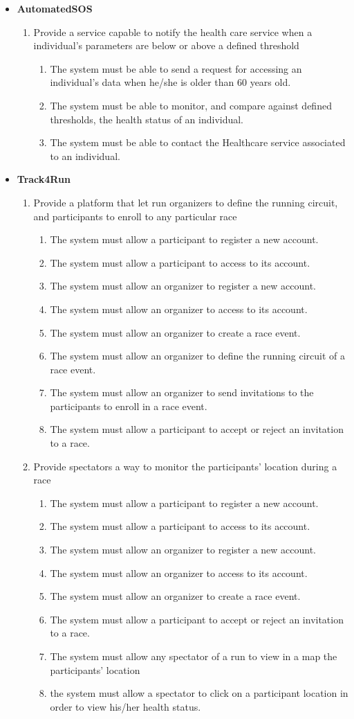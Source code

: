 \documentclass[12pt]{article}
\newcommand\requirement[1]{\item[{[R#1]}] }
\newcommand\goal[1]{\item[{[G#1]}] }
\begin{document}
\begin{itemize}
  \item{\textbf{AutomatedSOS}}
  \begin{enumerate}
    \goal{5} Provide a service capable to notify the health care service when a individual's parameters are below or above a defined threshold
    \begin{enumerate}
      \requirement{13} The system must be able to send a request for accessing an individual's data when he/she is older than 60 years old.
      \requirement{14} The system must be able to monitor, and compare against defined thresholds, the health status of an individual.
      \requirement{15} The system must be able to contact the Healthcare service associated to an individual.      
    \end{enumerate}
  \end{enumerate}
  
  \item{\textbf{Track4Run}}
  \begin{enumerate}
    \goal{6} Provide a platform that let run organizers to define the running circuit, and participants to enroll to any particular race
    \begin{enumerate}
      \requirement{16} The system must allow a participant to register a new account.
      \requirement{17} The system must allow a participant to access to its account.
      \requirement{18} The system must allow an organizer to register a new account.
      \requirement{19} The system must allow an organizer to access to its account.
      \requirement{20} The system must allow an organizer to create a race event.
      \requirement{21} The system must allow an organizer to define the running circuit of a race event.
      \requirement{22} The system must allow an organizer to send invitations to the participants to enroll in a race event.
      \requirement{23} The system must allow a participant to accept or reject an invitation to a race.
    \end{enumerate}
    \goal{7} Provide spectators a way to monitor the participants' location during a race
    \begin{enumerate}
      \requirement{16} The system must allow a participant to register a new account.
      \requirement{17} The system must allow a participant to access to its account.
      \requirement{18} The system must allow an organizer to register a new account.
      \requirement{19} The system must allow an organizer to access to its account.
      \requirement{20} The system must allow an organizer to create a race event.
      \requirement{23} The system must allow a participant to accept or reject an invitation to a race.
      \requirement{24} The system must allow any spectator of a run to view in a map the participants' location
      \requirement{25} the system must allow a spectator to click on a participant location in order to view his/her health status.
    \end{enumerate}
  \end{enumerate}

\end{itemize}
\end{document}
